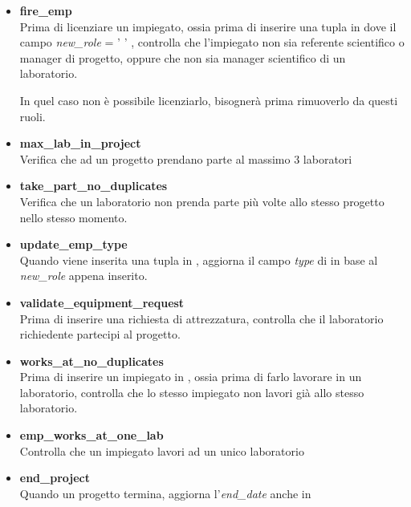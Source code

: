 \begin{itemize}
	\item \textbf{fire\_emp}\\
	      Prima di licenziare un impiegato, ossia prima di inserire una tupla in \textit{\careerlog} dove il campo \textit{new\_role} = ' ' , controlla che l'impiegato non sia referente scientifico o manager di progetto, oppure che non sia manager scientifico di un laboratorio.

	      In quel caso non è possibile licenziarlo, bisognerà prima rimuoverlo da questi ruoli.

	\item \textbf{max\_lab\_in\_project}\\
	      Verifica che ad un progetto prendano parte al massimo $3$ laboratori

	\item \textbf{take\_part\_no\_duplicates}\\
	      Verifica che un laboratorio non prenda parte più volte allo stesso progetto nello stesso momento.

	\item \textbf{update\_emp\_type}\\
	      Quando viene inserita una tupla in \textit{\careerlog}, aggiorna il campo \textit{type} di \textit{\baseemp} in base al \textit{new\_role} appena inserito.

	\item \textbf{validate\_equipment\_request}\\
	      Prima di inserire una richiesta di attrezzatura, controlla che il laboratorio richiedente partecipi al progetto.

	\item \textbf{works\_at\_no\_duplicates}\\
	      Prima di inserire un impiegato in \textit{\worksat}, ossia prima di farlo lavorare in un laboratorio, controlla che lo stesso impiegato non lavori già allo stesso laboratorio.

	\item \textbf{emp\_works\_at\_one\_lab}\\
	      Controlla che un impiegato lavori ad un unico laboratorio


	\item \textbf{end\_project}\\
	      Quando un progetto termina, aggiorna l'\textit{end\_date} anche in \textit{\takepart}
\end{itemize}
